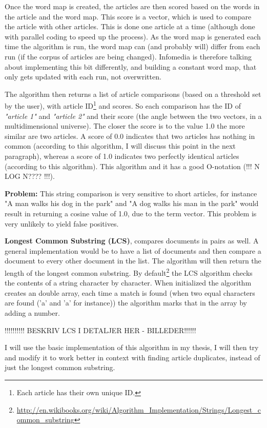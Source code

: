 Once the word map is created, the articles are then scored based on the words in the article and the word map. This score is a vector, which is used to compare the article with other articles. This is done one article at a time (although done with parallel coding to speed up the process). As the word map is generated each time the algorithm is run, the word map can (and probably will) differ from each run (if the corpus of articles are being changed). Infomedia is therefore talking about implementing this bit differently, and building a constant word map, that only gets updated with each run, not overwritten.

The algorithm then returns a list of article comparisons (based on a threshold set by the user), with article ID\footnote{Each article has their own unique ID.} and scores. So each comparison has the ID of \textit{"article 1"} and \textit{"article 2"} and their score (the angle between the two vectors, in a multidimensional universe). The closer the score is to the value 1.0 the more similar are two articles. A score of 0.0 indicates that two articles has nothing in common (according to this algorithm, I will discuss this point in the next paragraph), whereas a score of 1.0 indicates two perfectly identical articles (according to this algorithm). This algorithm and it has a good O-notation (!!! N LOG N???? !!!).

\textbf{Problem:} This string comparison is very sensitive to short articles, for instance "A man walks his dog in the park" and "A dog walks his man in the park" would result in returning a cosine value of 1.0, due to the term vector. This problem is very unlikely to yield false positives.

\textbf{Longest Common Substring (LCS)}, compares documents in pairs as well. A general implementation would be to have a list of documents and then compare a document to every other document in the list. The algorithm will then return the length of the longest common substring. By default\footnote{\url{http://en.wikibooks.org/wiki/Algorithm_Implementation/Strings/Longest_common_substring}} the LCS algorithm checks the contents of a string character by character. When initialized the algorithm creates an double array, each time a match is found (when two equal characters are found ('a' and 'a' for instance)) the algorithm marks that in the array by adding a number. 

!!!!!!!!!! BESKRIV LCS I DETALJER HER - BILLEDER!!!!!!

I will use the basic implementation of this algorithm in my thesis, I will then try and modify it to work better in context with finding article duplicates, instead of just the longest common substring.


